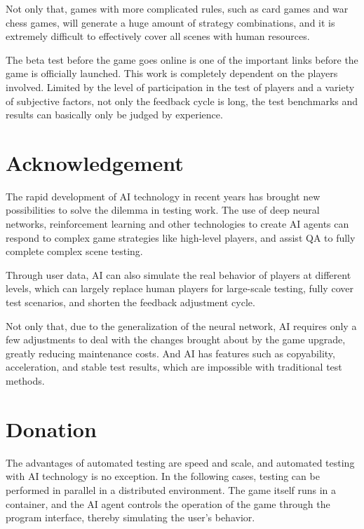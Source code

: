 \documentclass[11pt,en,authoryear]{elegantpaper}
\begin{document}
Not only that, games with more complicated rules, such as card games and war chess games, will generate a huge amount of strategy combinations, and it is extremely difficult to effectively cover all scenes with human resources.

The beta test before the game goes online is one of the important links before the game is officially launched. This work is completely dependent on the players involved. Limited by the level of participation in the test of players and a variety of subjective factors, not only the feedback cycle is long, the test benchmarks and results can basically only be judged by experience.


\section{Acknowledgement}
The rapid development of AI technology in recent years has brought new possibilities to solve the dilemma in testing work. The use of deep neural networks, reinforcement learning and other technologies to create AI agents can respond to complex game strategies like high-level players, and assist QA to fully complete complex scene testing.

Through user data, AI can also simulate the real behavior of players at different levels, which can largely replace human players for large-scale testing, fully cover test scenarios, and shorten the feedback adjustment cycle.

Not only that, due to the generalization of the neural network, AI requires only a few adjustments to deal with the changes brought about by the game upgrade, greatly reducing maintenance costs. And AI has features such as copyability, acceleration, and stable test results, which are impossible with traditional test methods.

\section{Donation}
The advantages of automated testing are speed and scale, and automated testing with AI technology is no exception. In the following cases, testing can be performed in parallel in a distributed environment. The game itself runs in a container, and the AI ​​agent controls the operation of the game through the program interface, thereby simulating the user's behavior.


\end{document}

